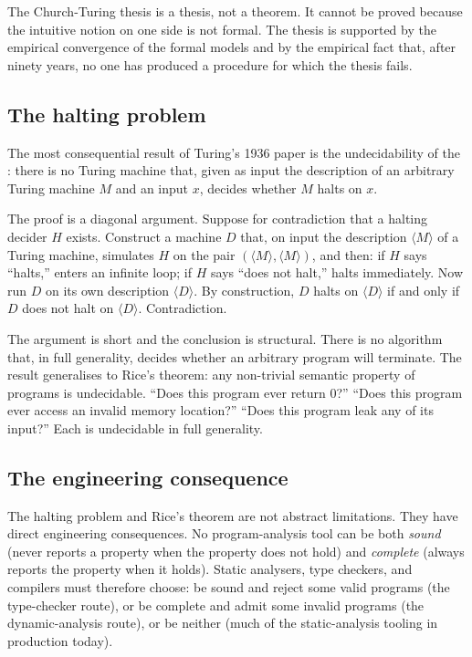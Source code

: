 The Church-Turing thesis is a thesis, not a theorem. It cannot be proved because the intuitive notion on one side is not formal. The thesis is supported by the empirical convergence of the formal models and by the empirical fact that, after ninety years, no one has produced a procedure for which the thesis fails.

\subsection{The halting problem}

The most consequential result of Turing's 1936 paper is the undecidability of the : there is no Turing machine that, given as input the description of an arbitrary Turing machine $M$ and an input $x$, decides whether $M$ halts on $x$.

The proof is a diagonal argument. Suppose for contradiction that a halting decider $H$ exists. Construct a machine $D$ that, on input the description $\langle M \rangle$ of a Turing machine, simulates $H$ on the pair $(\langle M \rangle, \langle M \rangle)$, and then: if $H$ says ``halts,'' enters an infinite loop; if $H$ says ``does not halt,'' halts immediately. Now run $D$ on its own description $\langle D \rangle$. By construction, $D$ halts on $\langle D \rangle$ if and only if $D$ does not halt on $\langle D \rangle$. Contradiction.

The argument is short and the conclusion is structural. There is no algorithm that, in full generality, decides whether an arbitrary program will terminate. The result generalises to Rice's theorem: any non-trivial semantic property of programs is undecidable. ``Does this program ever return $0$?'' ``Does this program ever access an invalid memory location?'' ``Does this program leak any of its input?'' Each is undecidable in full generality.

\subsection{The engineering consequence}

The halting problem and Rice's theorem are not abstract limitations. They have direct engineering consequences. No program-analysis tool can be both \emph{sound} (never reports a property when the property does not hold) and \emph{complete} (always reports the property when it holds). Static analysers, type checkers, and compilers must therefore choose: be sound and reject some valid programs (the type-checker route), or be complete and admit some invalid programs (the dynamic-analysis route), or be neither (much of the static-analysis tooling in production today).

